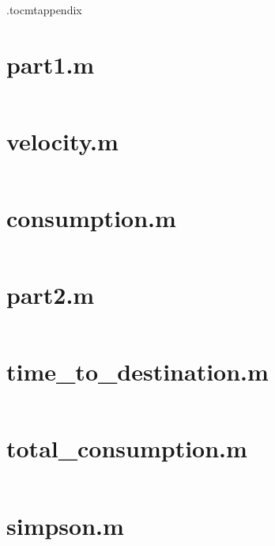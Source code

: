 \documentclass[]{scrreprt}
\begin{document}
\begin{appendices}
\etocdepthtag.toc{mtappendix}
\tableofcontents
\renewcommand\FancyVerbSpace{\textcolor{white}{\char32}}
\newcommand\emptyaccsupp[1]{\BeginAccSupp{ActualText={}}#1\EndAccSupp{}}
\let\theHFancyVerbLine\theFancyVerbLine%
\def\theFancyVerbLine{\rmfamily\tiny\emptyaccsupp{\arabic{FancyVerbLine}}}
\chapter{part1.m}
\inputminted[linenos=true,frame=leftline]{matlab}{roadster/part1.m}
%
\chapter{velocity.m}
\inputminted[linenos=true,frame=leftline]{matlab}{roadster/velocity.m}
\chapter{consumption.m}
\inputminted[linenos=true,frame=leftline]{matlab}{roadster/consumption.m}
\chapter{part2.m}
\inputminted[linenos=true,frame=leftline]{matlab}{roadster/part2.m}
\chapter{time\_to\_destination.m}
\inputminted[linenos=true,frame=leftline]{matlab}{roadster/time_to_destination.m}
\chapter{total\_consumption.m}
\inputminted[linenos=true,frame=leftline]{matlab}{roadster/total_consumption.m}
\chapter{simpson.m}
\inputminted[linenos=true,frame=leftline]{matlab}{roadster/simpson.m}

\end{appendices}
\end{document}
